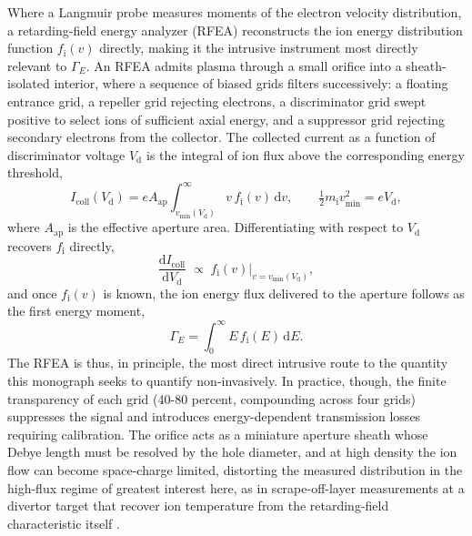 Where a Langmuir probe measures moments of the electron velocity distribution, a retarding-field energy analyzer (RFEA) reconstructs the ion energy distribution function $f_{\mathrm{i}}(v)$ directly, making it the intrusive instrument most directly relevant to $\Gamma_{E}$. An RFEA admits plasma through a small orifice into a sheath-isolated interior, where a sequence of biased grids filters successively: a floating entrance grid, a repeller grid rejecting electrons, a discriminator grid swept positive to select ions of sufficient axial energy, and a suppressor grid rejecting secondary electrons from the collector. The collected current as a function of discriminator voltage $V_{\mathrm{d}}$ is the integral of ion flux above the corresponding energy threshold,
\begin{equation}
I_{\mathrm{coll}}(V_{\mathrm{d}}) = e A_{\mathrm{ap}} \int_{v_{\min}(V_{\mathrm{d}})}^{\infty} v\, f_{\mathrm{i}}(v)\, \mathrm{d}v,
\qquad
\tfrac{1}{2} m_{\mathrm{i}} v_{\min}^2 = e V_{\mathrm{d}},
\label{eq:rfea-collected}
\end{equation}
where $A_{\mathrm{ap}}$ is the effective aperture area. Differentiating with respect to $V_{\mathrm{d}}$ recovers $f_{\mathrm{i}}$ directly,
\begin{equation}
\frac{\mathrm{d}I_{\mathrm{coll}}}{\mathrm{d}V_{\mathrm{d}}} \;\propto\; f_{\mathrm{i}}(v)\Big|_{v = v_{\min}(V_{\mathrm{d}})},
\label{eq:rfea-derivative}
\end{equation}
and once $f_{\mathrm{i}}(v)$ is known, the ion energy flux delivered to the aperture follows as the first energy moment,
\begin{equation}
\Gamma_{E} = \int_0^\infty E\, f_{\mathrm{i}}(E) \, \mathrm{d}E .
\label{eq:rfea-gammaE}
\end{equation}
The RFEA is thus, in principle, the most direct intrusive route to the quantity this monograph seeks to quantify non-invasively. In practice, though, the finite transparency of each grid (40-80 percent, compounding across four grids) suppresses the signal and introduces energy-dependent transmission losses requiring calibration. The orifice acts as a miniature aperture sheath whose Debye length must be resolved by the hole diameter, and at high density the ion flow can become space-charge limited, distorting the measured distribution in the high-flux regime of greatest interest here, as in scrape-off-layer measurements at a divertor target that recover ion temperature from the retarding-field characteristic itself \cite{ref0610}.

